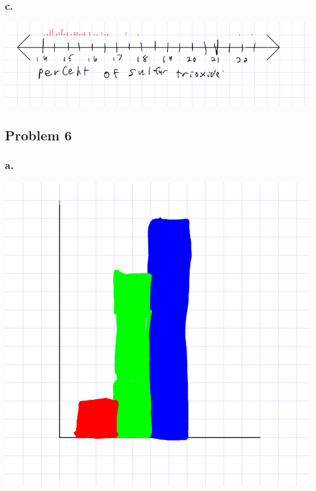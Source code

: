 \documentclass[11pt]{article}
\begin{document}
\subsubsection*{c.}
\includegraphics{homework2_section13_problem2c_dotplot}

\subsection*{Problem 6}
\subsubsection*{a.}
\includegraphics{homework2_section13_problem6a_histogram}
\end{document}
